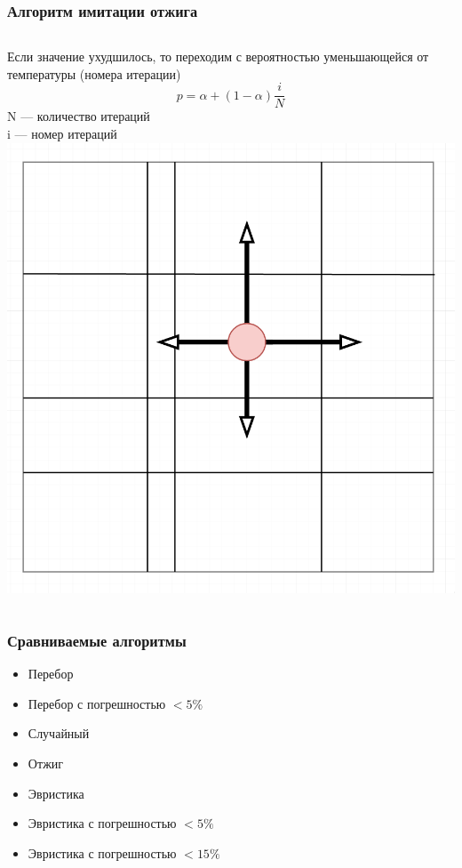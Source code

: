 \documentclass{beamer}
\begin{document}
\begin{frame} \frametitle{Алгоритм имитации отжига}
\begin{columns}
    Если значение ухудшилось, то переходим с вероятностью уменьшающейся от температуры (номера итерации)
    \[
    p=\alpha + (1 - \alpha) \frac{i}{N}
    \]
    N --- количество итераций\\
    i --- номер итераций
    \includegraphics[width=\textwidth]{gena_move.png}
\end{columns}
\end{frame}

\begin{frame} \frametitle{Сравниваемые алгоритмы}
    \begin{itemize}
        \item Перебор
        \item Перебор с погрешностью $<5\%$
        \item Случайный
        \item Отжиг
        \item Эвристика
        \item Эвристика с погрешностью $<5\%$
        \item Эвристика с погрешностью $<15\%$
    \end{itemize}
\end{frame}
\end{document}
